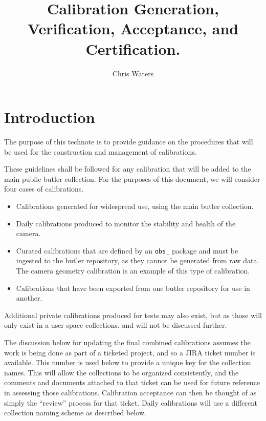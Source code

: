 \documentclass[DM,authoryear,toc]{lsstdoc}
\title{Calibration Generation, Verification, Acceptance, and Certification.}
\author{%
Chris Waters
}
\date{\vcsDate}
\begin{document}
\maketitle


\section{Introduction}

The purpose of this technote is to provide guidance on the procedures that will be used for the construction and management of calibrations.

These guidelines shall be followed for any calibration that will be added to the main public butler collection.  For the purposes of this document, we will consider four cases of calibrations.

\begin{itemize}
\item Calibrations generated for widespread use, using the main butler collection.
\item Daily calibrations produced to monitor the stability and health of the camera.
\item Curated calibrations that are defined by an \verb|obs_| package and must be ingested to the butler repository, as they cannot be generated from raw data.  The camera geometry calibration is an example of this type of calibration.
\item Calibrations that have been exported from one butler repository for use in another.
\end{itemize}

Additional private calibrations produced for tests may also exist, but as those will only exist in a user-space collections, and will not be discussed further.

The discussion below for updating the final combined calibrations assumes the work is being done as part of a ticketed project, and so a JIRA ticket number is available.  This number is used below to provide a unique key for the collection names.  This will allow the collections to be organized consistently, and the comments and documents attached to that ticket can be used for future reference in assessing those calibrations.  Calibration acceptance can then be thought of as simply the ``review'' process for that ticket.  Daily calibrations will use a different collection naming scheme as described below.
\end{document}
